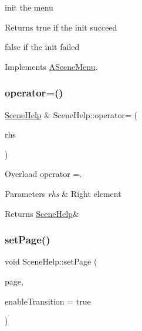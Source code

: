init the menu 

\begin{DoxyReturn}{Returns}
true if the init succeed 

false if the init failed 
\end{DoxyReturn}


Implements \hyperlink{class_a_scene_menu_a78bdee98bd7df224524586a060f9bdec}{A\+Scene\+Menu}.

\mbox{\label{class_scene_help_a760a6a537ff90f4e403b06536a837286}} 
\subsubsection{\texorpdfstring{operator=()}{operator=()}}
{\footnotesize\ttfamily \hyperlink{class_scene_help}{Scene\+Help} \& Scene\+Help\+::operator= (\begin{DoxyParamCaption}\item[{\hyperlink{class_scene_help}{Scene\+Help} const \&}]{rhs }\end{DoxyParamCaption})}



Overload operator =. 


\begin{DoxyParams}{Parameters}
{\em rhs} & Right element \\
\hline
\end{DoxyParams}
\begin{DoxyReturn}{Returns}
\hyperlink{class_scene_help}{Scene\+Help}\& 
\end{DoxyReturn}
\mbox{\label{class_scene_help_a176c192d334d8e0a9be2eea5ed3a60f8}} 
\subsubsection{\texorpdfstring{set\+Page()}{setPage()}}
{\footnotesize\ttfamily void Scene\+Help\+::set\+Page (\begin{DoxyParamCaption}\item[{int32\+\_\+t}]{page,  }\item[{bool}]{enable\+Transition = {\ttfamily true} }\end{DoxyParamCaption})}



